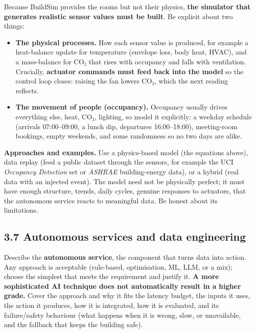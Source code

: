 \documentclass[
  11pt,
]{article}
\providecommand{\tightlist}{%
  \setlength{\itemsep}{0pt}\setlength{\parskip}{0pt}}
\begin{document}
Because BuildSim provides the rooms but not their physics, \textbf{the simulator that generates realistic sensor values must be built}. Be explicit
about two things:

\begin{itemize}
\tightlist
\item
  \textbf{The physical processes.} How each sensor value is produced, for example a heat-balance update for temperature (envelope loss, body
  heat, HVAC), and a mass-balance for CO₂ that rises with occupancy and
  falls with ventilation. Crucially, \textbf{actuator commands must feed
  back into the model} so the control loop closes: raising the fan
  lowers CO₂, which the next reading reflects.
\item
  \textbf{The movement of people (occupancy).} Occupancy usually drives
  everything else, heat, CO₂, lighting, so model it explicitly: a
  weekday schedule (arrivals 07:00--09:00, a lunch dip, departures
  16:00--18:00), meeting-room bookings, empty weekends, and some
  randomness so no two days are alike.
\end{itemize}

\textbf{Approaches and examples.} Use a physics-based model (the
equations above), data replay (feed a public dataset through the sensors, for example the UCI \emph{Occupancy Detection} set or
\emph{ASHRAE} building-energy data), or a hybrid (real data with an
injected event). The model need not be physically perfect; it must have
enough structure, trends, daily cycles, genuine responses to
actuators, that the autonomous service reacts to meaningful data. Be
honest about its limitations.

\hypertarget{autonomous-services-and-data-engineering}{%
\subsection{3.7 Autonomous services and data
engineering}\label{autonomous-services-and-data-engineering}}

Describe the \textbf{autonomous service}, the component that turns
data into action. Any approach is acceptable (rule-based, optimisation,
ML, LLM, or a mix); choose the simplest that meets the requirement and
justify it. \textbf{A more sophisticated AI technique does not
automatically result in a higher grade.}
Cover the approach and why it fits the latency budget, the inputs it
uses, the action it produces, how it is integrated, how it is evaluated,
and its failure/safety behaviour (what happens when it is wrong, slow,
or unavailable, and the fallback that keeps the building safe).
\end{document}
